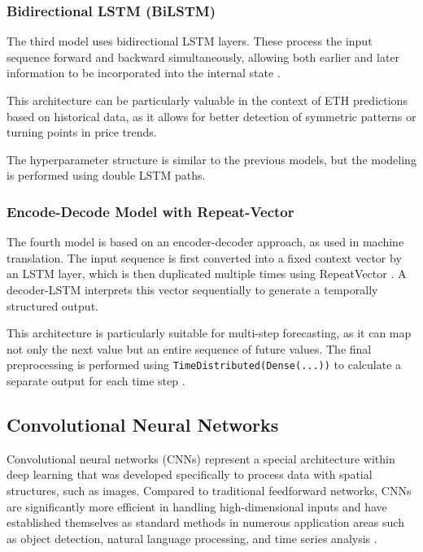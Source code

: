 \subsubsection{Bidirectional LSTM (BiLSTM)}

The third model uses bidirectional LSTM layers.
These process the input sequence forward and backward simultaneously, allowing both earlier and later information to be incorporated into the internal state \cite{bi-lstm}.

This architecture can be particularly valuable in the context of ETH predictions based on historical data, as it allows for better detection of symmetric patterns or turning points in price trends.

The hyperparameter structure is similar to the previous models, but the modeling is performed using double LSTM paths.



\subsubsection{Encode-Decode Model with Repeat-Vector}

The fourth model is based on an encoder-decoder approach, as used in machine translation.
The input sequence is first converted into a fixed context vector by an LSTM layer, which is then duplicated multiple times using RepeatVector \cite{keras-repeat-vector}.
A decoder-LSTM interprets this vector sequentially to generate a temporally structured output.

This architecture is particularly suitable for multi-step forecasting, as it can map not only the next value but an entire sequence of future values.
The final preprocessing is performed using \verb|TimeDistributed(Dense(...))| to calculate a separate output for each time step \cite{keras-time-distributed}.



\subsection{Convolutional Neural Networks}
\label{chap:cnn}

Convolutional neural networks (CNNs) represent a special architecture within deep learning that was developed specifically to process data with spatial structures, such as images.
Compared to traditional feedforward networks, CNNs are significantly more efficient in handling high-dimensional inputs and have established themselves as standard methods in numerous application areas such as object detection, natural language processing, and time series analysis \cite{cnn-for-time-series}.


